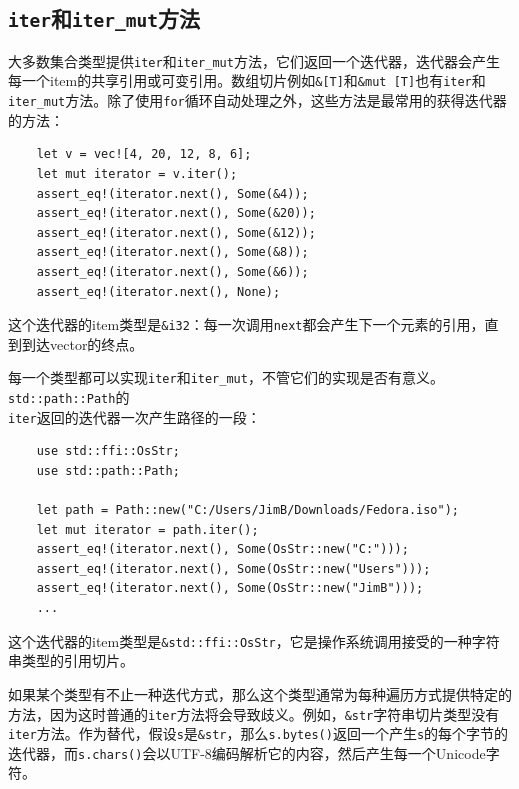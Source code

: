\subsection{\texttt{iter}和\texttt{iter\_mut}方法}\label{IterMethod}
大多数集合类型提供\texttt{iter}和\texttt{iter\_mut}方法，它们返回一个迭代器，迭代器会产生每一个item的共享引用或可变引用。数组切片例如\texttt{\&[T]}和\texttt{\&mut [T]}也有\texttt{iter}和\texttt{iter\_mut}方法。除了使用\texttt{for}循环自动处理之外，这些方法是最常用的获得迭代器的方法：
\begin{verbatim}
    let v = vec![4, 20, 12, 8, 6];
    let mut iterator = v.iter();
    assert_eq!(iterator.next(), Some(&4));
    assert_eq!(iterator.next(), Some(&20));
    assert_eq!(iterator.next(), Some(&12));
    assert_eq!(iterator.next(), Some(&8));
    assert_eq!(iterator.next(), Some(&6));
    assert_eq!(iterator.next(), None);
\end{verbatim}

这个迭代器的item类型是\texttt{\&i32}：每一次调用\texttt{next}都会产生下一个元素的引用，直到到达vector的终点。

每一个类型都可以实现\texttt{iter}和\texttt{iter\_mut}，不管它们的实现是否有意义。\texttt{std::path::Path}的\\
\texttt{iter}返回的迭代器一次产生路径的一段：
\begin{verbatim}
    use std::ffi::OsStr;
    use std::path::Path;

    let path = Path::new("C:/Users/JimB/Downloads/Fedora.iso");
    let mut iterator = path.iter();
    assert_eq!(iterator.next(), Some(OsStr::new("C:")));
    assert_eq!(iterator.next(), Some(OsStr::new("Users")));
    assert_eq!(iterator.next(), Some(OsStr::new("JimB")));
    ...
\end{verbatim}

这个迭代器的item类型是\texttt{\&std::ffi::OsStr}，它是操作系统调用接受的一种字符串类型的引用切片。

如果某个类型有不止一种迭代方式，那么这个类型通常为每种遍历方式提供特定的方法，因为这时普通的\texttt{iter}方法将会导致歧义。例如，\texttt{\&str}字符串切片类型没有\texttt{iter}方法。作为替代，假设\texttt{s}是\texttt{\&str}，那么\texttt{s.bytes()}返回一个产生\texttt{s}的每个字节的迭代器，而\texttt{s.chars()}会以UTF-8编码解析它的内容，然后产生每一个Unicode字符。


